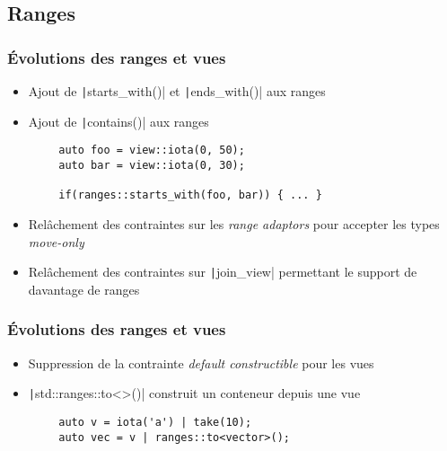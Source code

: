 \documentclass[C++.tex]{subfiles}
\begin{document}
\subsection*{Ranges}
\begin{frame}[fragile]
	\frametitle{Évolutions des ranges et vues}
	\begin{itemize}
		\item Ajout de \texttt|starts_with()| et \texttt|ends_with()| aux ranges
		\item Ajout de \texttt|contains()| aux ranges
	\end{itemize}

	\begin{verbatim}
		auto foo = view::iota(0, 50);
		auto bar = view::iota(0, 30);

		if(ranges::starts_with(foo, bar)) { ... }
	\end{verbatim}

	\begin{itemize}
		\item Relâchement des contraintes sur les \textit{range adaptors} pour accepter les types \textit{move-only}
		\item Relâchement des contraintes sur \texttt|join_view| permettant le support de davantage de ranges

	\end{itemize}

\end{frame}

\begin{frame}[fragile]
	\frametitle{Évolutions des ranges et vues}
	\begin{itemize}
		\item Suppression de la contrainte \textit{default constructible} pour les vues
		\item \texttt|std::ranges::to<>()| construit un conteneur depuis une vue
	\end{itemize}

	\begin{verbatim}
		auto v = iota('a') | take(10);
		auto vec = v | ranges::to<vector>();
	\end{verbatim}

\end{frame}
\end{document}
